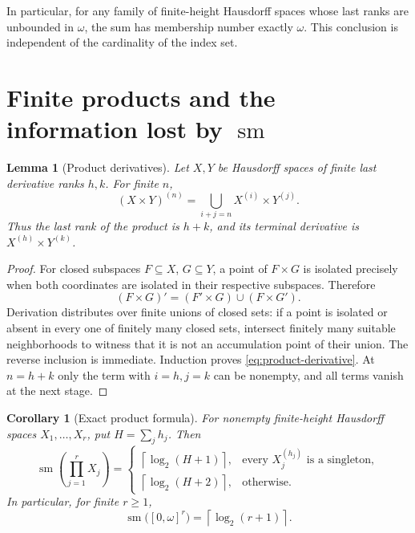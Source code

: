 \documentclass[11pt,letterpaper]{article}
\numberwithin{equation}{section}
\newtheorem{lemma}[lemma]{Lemma}
\newtheorem{corollary}[corollary]{Corollary}
\theoremstyle{definition}
\theoremstyle{remark}
\theoremstyle{definition}
\newcommand{\sm}{\operatorname{sm}}
\newcommand{\ceil}[1]{\left\lceil#1\right\rceil}
\begin{document}
In particular, for any family of finite-height Hausdorff spaces whose last
ranks are unbounded in $\omega$, the sum has membership number exactly $\omega$.
This conclusion is independent of the cardinality of the index set.

\section{Finite products and the information lost by \texorpdfstring{$\sm$}{sm}}

\begin{lemma}[Product derivatives]\label{lem:product}
Let $X,Y$ be Hausdorff spaces of finite last derivative ranks $h,k$.
For finite $n$,
\begin{equation}\label{eq:product-derivative}
 (X\times Y)^{(n)}=
 \bigcup_{i+j=n}X^{(i)}\times Y^{(j)}.
\end{equation}
Thus the last rank of the product is $h+k$, and its terminal derivative is
$X^{(h)}\times Y^{(k)}$.
\end{lemma}
\begin{proof}
For closed subspaces $F\subseteq X$, $G\subseteq Y$, a point of $F\times G$
is isolated precisely when both coordinates are isolated in their respective
subspaces. Therefore
\[
 (F\times G)'=(F'\times G)\cup(F\times G').
\]
Derivation distributes over finite unions of closed sets: if a point is
isolated or absent in every one of finitely many closed sets, intersect finitely
many suitable neighborhoods to witness that it is not an accumulation point
of their union. The reverse inclusion is immediate. Induction proves
\eqref{eq:product-derivative}. At $n=h+k$ only the term with $i=h,j=k$ can be
nonempty, and all terms vanish at the next stage.
\end{proof}

\begin{corollary}[Exact product formula]\label{cor:product}
For nonempty finite-height Hausdorff spaces $X_1,\ldots,X_r$, put
$H=\sum_j h_j$. Then
\[
 \sm\!\left(\prod_{j=1}^rX_j\right)=
 \begin{cases}
 \ceil{\log_2(H+1)},&\text{every }X_j^{(h_j)}\text{ is a singleton},\\
 \ceil{\log_2(H+2)},&\text{otherwise}.
 \end{cases}
\]
In particular, for finite $r\geq1$,
\begin{equation}\label{eq:power}
 \sm\bigl([0,\omega]^r\bigr)=\ceil{\log_2(r+1)}.
\end{equation}
\end{corollary}
\end{document}
